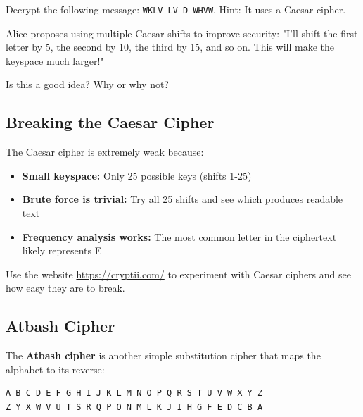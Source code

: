 \documentclass[11pt,a4paper]{report}
\begin{document}
\begin{ex}
Decrypt the following message: \verb|WKLV LV D WHVW|.
Hint: It uses a Caesar cipher.
\end{ex}

\begin{ex}
Alice proposes using multiple Caesar shifts to improve security: "I'll shift the first letter by 5, the second by 10, the third by 15, and so on. This will make the keyspace much larger!"

Is this a good idea? Why or why not?
\end{ex}

\subsection{Breaking the Caesar Cipher}

The Caesar cipher is extremely weak because:
\begin{itemize}
\item \textbf{Small keyspace:} Only 25 possible keys (shifts 1-25)
\item \textbf{Brute force is trivial:} Try all 25 shifts and see which produces readable text
\item \textbf{Frequency analysis works:} The most common letter in the ciphertext likely represents E
\end{itemize}

Use the website \url{https://cryptii.com/} to experiment with Caesar ciphers and see how easy they are to break.

\subsection{Atbash Cipher}

The \textbf{Atbash cipher} is another simple substitution cipher that maps the alphabet to its reverse:

\begin{verbatim}
A B C D E F G H I J K L M N O P Q R S T U V W X Y Z
Z Y X W V U T S R Q P O N M L K J I H G F E D C B A
\end{verbatim}
\end{document}
